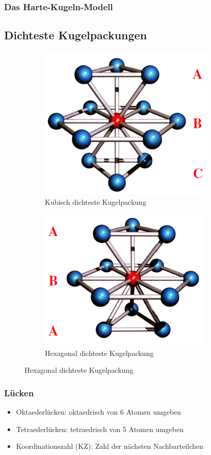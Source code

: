 \subsubsection{Das Harte-Kugeln-Modell}


\subsection{Dichteste Kugelpackungen}
\begin{figure}[htbp]
	\begin{subfigure}{0.49\linewidth}
		\centering
		\includegraphics[width=0.49\linewidth]{images/1_kubisch_dichteste_KuPa.png}
		\caption{Kubisch dichteste Kugelpackung}
	\end{subfigure}
	\begin{subfigure}{0.49\linewidth}
		\centering
		\includegraphics[width=0.49\linewidth]{images/1_hexagonal_dichteste_KuPa.png}
		\caption{Hexagonal dichteste Kugelpackung}
	\end{subfigure}
\end{figure}

\subsubsection{Lücken}
\begin{itemize}
	\item Oktaederlücken: oktaedrisch von 6 Atomen umgeben
	\item Tetraederlücken: tetraedrisch von 5 Atomen umgeben
	\item Koordinationszahl (KZ): Zahl der nächsten Nachbarteilchen
\end{itemize}

